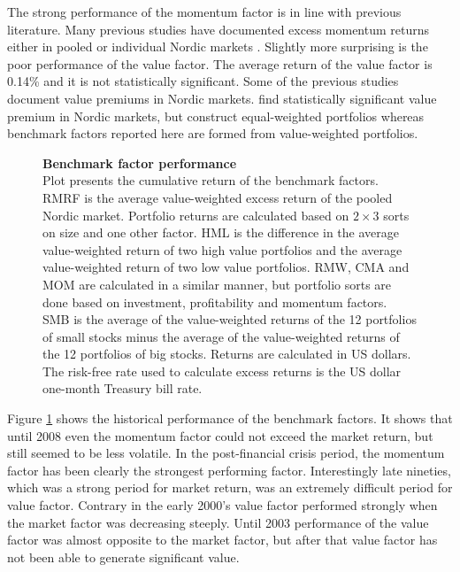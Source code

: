 \documentclass[12pt]{article}
\begin{document}
The strong performance of the momentum factor is in line with previous literature. Many previous studies have documented excess momentum returns either in pooled or individual Nordic markets \citep{grobys, leivo2011}. Slightly more surprising is the poor performance of the value factor. The average return of the value factor is 0.14\% and it is not statistically significant. Some of the previous studies document value premiums in Nordic markets. \citet{grobys} find statistically significant value premium in Nordic markets, but \citeauthor{grobys} construct equal-weighted portfolios whereas benchmark factors reported here are formed from value-weighted portfolios. \par

\begin{figure}[ht]
\centering
\caption[Benchmark factor performance]{\textbf{Benchmark factor performance}\\ Plot presents the cumulative return of the benchmark factors. RMRF is the average value-weighted excess return of the pooled Nordic market. Portfolio returns are calculated based on $2 \times 3$ sorts on size and one other factor. HML is the difference in the average value-weighted return of two high value portfolios and the average value-weighted return of two low value portfolios. RMW, CMA and MOM are calculated in a similar manner, but portfolio sorts are done based on investment, profitability and momentum factors. SMB is the average of the value-weighted returns of the 12 portfolios of small stocks minus the average of the value-weighted returns of the 12 portfolios of big stocks. Returns are calculated in US dollars. The risk-free rate used to calculate excess returns is the US dollar one-month Treasury bill rate.}

\label{plot:factor_performance}
\end{figure}

Figure \ref{plot:factor_performance} shows the historical performance of the benchmark factors. It shows that until 2008 even the momentum factor could not exceed the market return, but still seemed to be less volatile. In the post-financial crisis period, the momentum factor has been clearly the strongest performing factor. Interestingly late nineties, which was a strong period for market return, was an extremely difficult period for value factor. Contrary in the early 2000's value factor performed strongly when the market factor was decreasing steeply. Until 2003 performance of the value factor was almost opposite to the market factor, but after that value factor has not been able to generate significant value. \par
\end{document}
